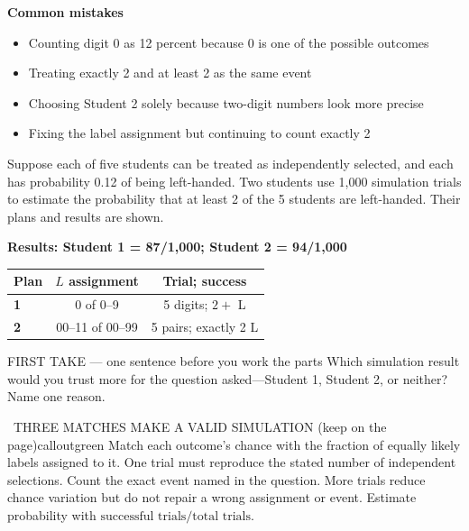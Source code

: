 \documentclass[11pt]{article}
\begin{document}
\textbf{Common mistakes}
\begin{itemize}[leftmargin=1.5em,itemsep=2pt,topsep=2pt]
  \item Counting digit 0 as 12 percent because 0 is one of the possible outcomes
  \item Treating exactly 2 and at least 2 as the same event
  \item Choosing Student 2 solely because two-digit numbers look more precise
  \item Fixing the label assignment but continuing to count exactly 2
\end{itemize}

\clearpage
{}

Suppose each of five students can be treated as independently selected, and each has probability 0.12 of being left-handed. Two students use 1,000 simulation trials to estimate the probability that at least 2 of the 5 students are left-handed. Their plans and results are shown.\par
\begin{center}
\textbf{Results: Student 1 = 87/1,000; Student 2 = 94/1,000}\par\smallskip
\begin{tabular}{|l|c|c|}
\hline
\textbf{Plan} & \textbf{$L$ assignment} & \textbf{Trial; success} \\ \hline
\textbf{1} & 0 of 0--9 & 5 digits; $2+$ L \\ \hline
\textbf{2} & 00--11 of 00--99 & 5 pairs; exactly 2 L \\ \hline
\end{tabular}
\end{center}
\begin{firsttakebox}{FIRST TAKE --- one sentence before you work the parts}
Which simulation result would you trust more for the question asked---Student 1, Student 2, or neither? Name one reason.\par
{}
\end{firsttakebox}

\begin{callout}{\IconBook\ THREE MATCHES MAKE A VALID SIMULATION (keep on the page)}{calloutgreen}
Match each outcome's chance with the fraction of equally likely labels assigned to it. One trial must reproduce the stated number of independent selections. Count the exact event named in the question. More trials reduce chance variation but do not repair a wrong assignment or event. Estimate probability with $\text{successful trials}/\text{total trials}$.
\end{callout}
\end{document}
